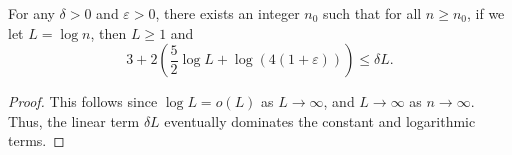 \begin{helper}
\label{helper:ProjectionSizeAnalyticErrorAbsorption}
For any $\delta > 0$ and $\varepsilon > 0$, there exists an integer $n_0$ such that for all $n \ge n_0$, if we let $L = \log n$, then $L \ge 1$ and
$$ 3 + 2 \left( \frac{5}{2} \log L + \log(4(1+\varepsilon)) \right) \le \delta L. $$
\end{helper}
\begin{proof}
This follows since $\log L = o(L)$ as $L \to \infty$, and $L \to \infty$ as $n \to \infty$. Thus, the linear term $\delta L$ eventually dominates the constant and logarithmic terms.
\end{proof}

